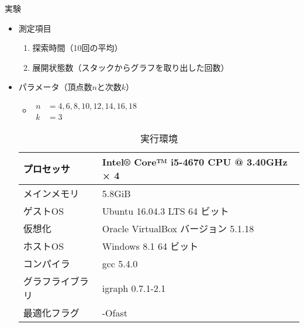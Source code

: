 \begin{frame}{実験}
  \begin{itemize}
  \item 測定項目
    \begin{enumerate}
    \item 探索時間（10回の平均）
    \item 展開状態数（スタックからグラフを取り出した回数）
    \end{enumerate}
  \item パラメータ（頂点数$n$と次数$k$）
    \begin{itemize}
    \item[]\par$\begin{aligned}
      n &= 4,6,8,10,12,14,16,18 \\
      k &= 3
    \end{aligned}$
    \end{itemize}
    \vspace{1em}
    \par\begin{table}
    \scriptsize
    \caption{実行環境}
    \label{tab:env-lab}
    \centering
    \begin{tabular}{ll}
      \hline
      プロセッサ & Intel® Core™ i5-4670 CPU @ 3.40GHz × 4 \\ \hline
      メインメモリ & 5.8GiB \\ \hline
      ゲストOS & Ubuntu 16.04.3 LTS 64 ビット \\ \hline
      仮想化 & Oracle VirtualBox バージョン 5.1.18 \\ \hline
      ホストOS & Windows 8.1 64 ビット \\ \hline
      コンパイラ & gcc 5.4.0 \\ \hline
      グラフライブラリ & igraph 0.7.1-2.1 \\ \hline
      最適化フラグ & -Ofast \\ \hline
    \end{tabular}
    \end{table}
  \end{itemize}
\end{frame}

